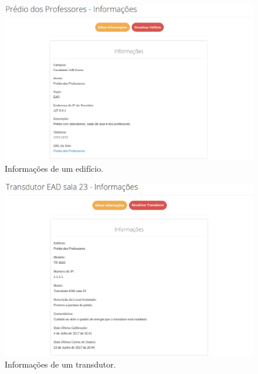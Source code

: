 \begin{anexosenv}
\begin{figure}[!htpb]
    \centering
    \includegraphics[keepaspectratio=true,scale=0.55]{figuras/img12.eps}
    \caption{Informações de um edifício.}
    \label{img12}
\end{figure}

\begin{figure}[!htpb]
    \centering
    \includegraphics[keepaspectratio=true,scale=0.6]{figuras/img13.eps}
    \caption{Informações de um transdutor.}
    \label{img13}
\end{figure}


\end{anexosenv}
